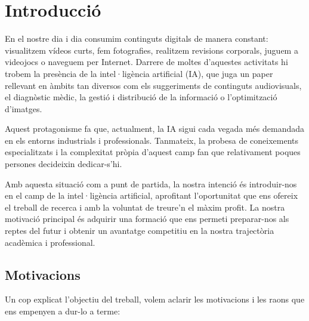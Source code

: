 \chapter{Introducció}
\label{c:intro}
En el nostre dia i dia consumim continguts digitals de manera constant: visualitzem vídeos curts, fem fotografies, realitzem revisions corporals, juguem a videojocs o naveguem per Internet. Darrere de moltes d’aquestes activitats hi trobem la presència de la intel·ligència artificial (IA), que juga un paper rellevant en àmbits tan diversos com els suggeriments de continguts audiovisuals, el diagnòstic mèdic, la gestió i distribució de la informació o l’optimització d’imatges.

Aquest protagonisme fa que, actualment, la IA sigui cada vegada més demandada en els entorns industrials i professionals. Tanmateix, la probesa de coneixements especialitzats i la complexitat pròpia d’aquest camp fan que relativament poques persones decideixin dedicar-s’hi.

Amb aquesta situació com a punt de partida, la nostra intenció és introduir-nos en el camp de la intel·ligència artificial, aprofitant l’oportunitat que ens ofereix el treball de recerca i amb la voluntat de treure’n el màxim profit. La nostra motivació principal és adquirir una formació que ens permeti preparar-nos als reptes del futur i obtenir un avantatge competitiu en la nostra trajectòria acadèmica i professional.






\section{Motivacions}
Un cop explicat l’objectiu del treball, volem aclarir les motivacions i les raons que ens empenyen a dur-lo a terme:

